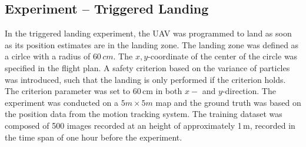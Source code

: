 \subsection{Experiment -- Triggered Landing}

In the triggered landing experiment, the UAV was programmed to land as soon as its position estimates are in the landing zone. The landing zone was defined as a cirlce with a radius of $60\,cm$. The $x,y$-coordinate of the center of the circle was specified in the flight plan. A safety criterion based on the variance of particles was introduced, such that the landing is only performed if the criterion holds. The criterion parameter was set to 60\,cm in both $x-$ and $y$-direction. The experiment was conducted on a $5m \times 5m$ map and the ground truth was based on the position data from the motion tracking system. The training dataset was composed of 500 images recorded at an height of approximately 1\,m, recorded in the time span of one hour before the experiment.   